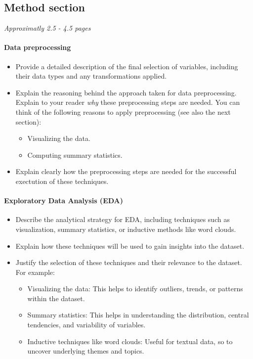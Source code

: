 \subsection{Method section}
\textit{Approximatly 2.5 - 4.5 pages}

\paragraph{Data preprocessing}
\begin{itemize}
    \item Provide a detailed description of  the final selection of variables, including their data types and any transformations applied.
    \item Explain the reasoning behind the approach taken for data preprocessing. Explain to your reader \emph{why} these preprocessing steps are needed. You can think of the following reasons to apply preprocessing (see also the next section):
        \begin{itemize}
            \item Visualizing the data.
            \item Computing summary statistics.
        \end{itemize}
  \item Explain clearly how the preprocessing steps are needed for the successful exectution of these techniques. 
\end{itemize}

\paragraph{Exploratory Data Analysis (EDA)}
\begin{itemize}
    \item Describe the analytical strategy for EDA, including techniques such as visualization, summary statistics, or inductive methods like word clouds.
    \item Explain how these techniques will be used to gain insights into the dataset.
	\item Justify the selection of these techniques and their relevance to the dataset. For example:
	\begin{itemize}
		\item Visualizing the data: This helps to identify outliers, trends, or patterns within the dataset.
		\item Summary statistics: This helps in understanding the distribution, central tendencies, and variability of variables.
		\item Inductive techniques like word clouds: Useful for textual data, so to uncover underlying themes and topics.
	\end{itemize}
\end{itemize}

